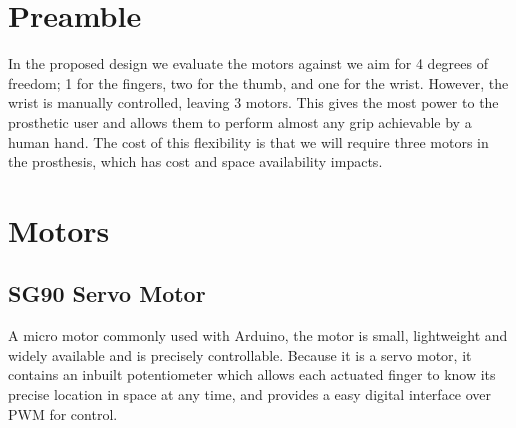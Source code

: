 \documentclass[12pt,3p]{report}
\begin{document}
\begin{multicols}{2}

	\section{Preamble}

		In the proposed design we evaluate the motors against we aim for 4 degrees of freedom; 1 for the fingers,
		two for the thumb, and one for the wrist. However, the wrist is manually controlled, leaving 3 motors.
		 This gives the most power to the prosthetic user and allows
		them to perform almost any grip achievable by a human hand. The cost of this
		flexibility is that we will require three motors in the prosthesis, which has
		cost and space availability impacts.

	\section{Motors}
	
		\subsection{SG90 Servo Motor}
	
		A micro motor commonly used with Arduino, the motor is small, lightweight
		and widely available and is precisely controllable. Because it is a servo
		motor, it contains an inbuilt potentiometer which allows each actuated finger
		to know its precise location in space at any time, and provides a easy digital
		interface over PWM for control.


\end{multicols}
\end{document}
